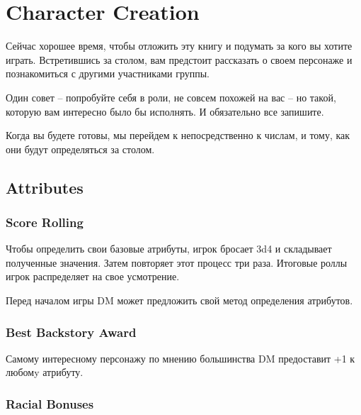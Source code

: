 \documentclass[a4paper,12pt,twocolumn]{book}
\begin{document}
%
%

\chapter{Character Creation}

\lettrine{С}{}ейчас хорошее время, чтобы отложить эту книгу и подумать за кого вы хотите играть. Встретившись за столом, вам предстоит рассказать о своем персонаже и познакомиться с другими участниками группы.

Один совет -- попробуйте себя в роли, не совсем похожей на вас -- но такой, которую вам интересно было бы исполнять. И обязательно все запишите.

Когда вы будете готовы, мы перейдем к непосредственно к числам, и тому, как они будут определяться за столом.

\section{Attributes}

\subsection{Score Rolling}

Чтобы определить свои базовые атрибуты, игрок бросает 3d4 и складывает полученные значения. Затем повторяет этот процесс три раза. Итоговые роллы игрок распределяет на свое усмотрение.

Перед началом игры DM может предложить свой метод определения атрибутов.

\subsection{Best Backstory Award}

Самому интересному персонажу по мнению большинства DM предоставит +1 к любомy атрибуту.

\subsection{Racial Bonuses}
\end{document}
